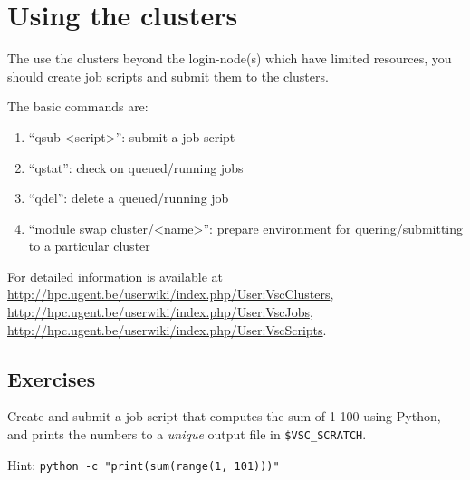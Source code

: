 \chapter{Using the clusters}

The use the clusters beyond the \gls{login-node}(s) which have limited resources, you
should create job scripts and submit them to the clusters.

The basic commands are:

\begin{enumerate}
 \item``qsub <script>'': submit a job script
 \item``qstat'': check on queued/running jobs
 \item``qdel'': delete a queued/running job
 \item``module swap cluster/<name>'': prepare environment for quering/submitting to a particular cluster
\end{enumerate}

For detailed information is available at
\url{http://hpc.ugent.be/userwiki/index.php/User:VscClusters},
\url{http://hpc.ugent.be/userwiki/index.php/User:VscJobs},
\url{http://hpc.ugent.be/userwiki/index.php/User:VscScripts}.

\section{Exercises}

Create and submit a job script that computes the sum of 1-100 using Python, and
prints the numbers to a \emph{unique} output file in \verb|$VSC_SCRATCH|.

Hint: \verb|python -c "print(sum(range(1, 101)))"|
